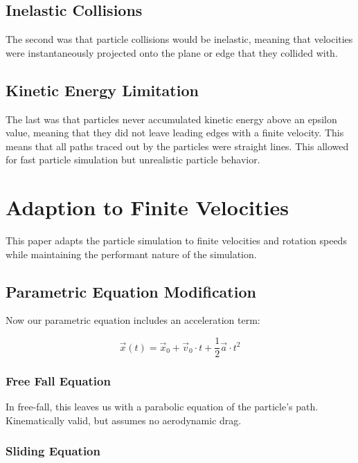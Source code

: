 

	\subsection{Inelastic Collisions}
The second was that particle collisions would be inelastic, meaning that velocities were instantaneously projected onto the plane or edge that they collided with.



	\subsection{Kinetic Energy Limitation}

The last was that particles never accumulated kinetic energy above an epsilon value, meaning that they did not leave leading edges with a finite velocity. This means that all paths traced out by the particles were straight lines. This allowed for fast particle simulation but unrealistic particle behavior.

\section{Adaption to Finite Velocities}

This paper adapts the particle simulation to finite velocities and rotation speeds while maintaining the performant nature of the simulation.

	\subsection{Parametric Equation Modification}

Now our parametric equation includes an acceleration term:

$$
\vec{x}(t) = \vec{x}_0 + \vec{v}_{0} \cdot t + \frac{1}{2}\vec{a} \cdot t^2
$$

		\subsubsection{Free Fall Equation}
In free-fall, this leaves us with a parabolic equation of the particle's path. Kinematically valid, but assumes no aerodynamic drag.


		\subsubsection{Sliding Equation}

